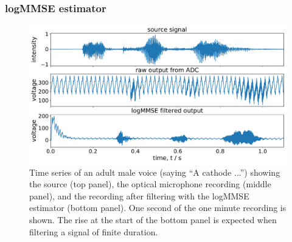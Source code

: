 \documentclass[paper-main.tex]{subfiles}
\begin{document}








\subsubsection{logMMSE estimator}
\label{sec:logmmse}


\begin{figure}
	\includegraphics[width=\textwidth]{figures/combined_timeseries_melatos.pdf}
	\caption{Time series of an adult male voice (saying ``A cathode ...'') showing the source (top panel), the optical microphone recording (middle panel), and the recording after filtering with the logMMSE estimator (bottom panel). One second of the one minute recording is shown. The rise at the start of the bottom panel is expected when filtering a signal of finite duration.}
	\label{fig:logMMSE_timeseries}
\end{figure}
\end{document}
